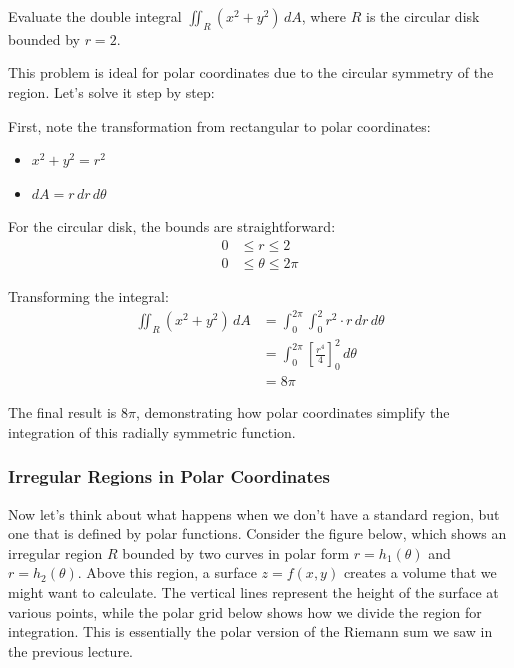 \exampleline
\begin{example}
Evaluate the double integral \(\displaystyle\iint_R (x^2 + y^2)\,dA\), where $R$ is the circular disk bounded by $r = 2$.

\begin{solution} This problem is ideal for polar coordinates due to the circular symmetry of the region. Let's solve it step by step:

\noindent First, note the transformation from rectangular to polar coordinates:
\begin{itemize}
    \item $x^2 + y^2 = r^2$
    \item $dA = r\,dr\,d\theta$
\end{itemize}

\noindent For the circular disk, the bounds are straightforward:
\begin{align*}
0 &\leq r \leq 2 \\
0 &\leq \theta \leq 2\pi
\end{align*}

\noindent Transforming the integral:
\begin{align*}
\iint_R (x^2 + y^2)\,dA &= \int_0^{2\pi} \int_0^2 r^2 \cdot r\,dr\,d\theta \\
&= \int_0^{2\pi} \left[\frac{r^4}{4}\right]_0^2 \,d\theta \\
&= 8\pi
\end{align*}

\noindent The final result is $8\pi$, demonstrating how polar coordinates simplify the integration of this radially symmetric function.
\end{solution}
\end{example}
\exampleline

\subsubsection*{Irregular Regions in Polar Coordinates} 


\noindent Now let's think about what happens when we don't have a standard region, but one that is defined by polar functions. Consider the figure below, which shows an irregular region $R$ bounded by two curves in polar form $r = h_1(\theta)$ and $r = h_2(\theta)$. Above this region, a surface $z = f(x,y)$ creates a volume that we might want to calculate. The vertical lines represent the height of the surface at various points, while the polar grid below shows how we divide the region for integration. This is essentially the polar version of the Riemann sum we saw in the previous lecture.


